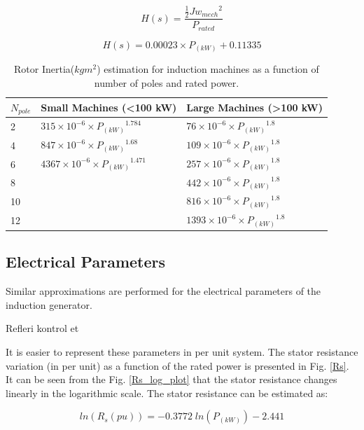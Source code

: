 \documentclass[twocolumn]{article}
\begin{document}
\begin{equation}
	H(s)=\frac{\frac{1}{2} J {w_{mech}}^2}{P_{rated}}
	\label{eq:time_constant}
\end{equation}

\begin{equation}
	H(s)=0.00023 \times P_{(kW)} + 0.11335
	\label{eq:time_constant_trend}
\end{equation}

\begin{table}
  \centering
  \begin{tabular}{lll}
   $N_{pole}$ & Small Machines (<100 kW) & Large Machines (>100 kW) \\
  \hline
2 & $315\times10^{-6}\times {P_{(kW)}}^{1.784}$ & $76\times10^{-6}\times {P_{(kW)}}^{1.8}$ \\
4 & $847\times10^{-6}\times {P_{(kW)}}^{1.68}$ & $109\times10^{-6}\times {P_{(kW)}}^{1.8}$ \\
6 & $4367\times10^{-6}\times {P_{(kW)}}^{1.471}$ & $257\times10^{-6}\times {P_{(kW)}}^{1.8}$ \\
8 &  & $442\times10^{-6}\times {P_{(kW)}}^{1.8}$ \\
10 & & $816\times10^{-6}\times {P_{(kW)}}^{1.8}$ \\
12 & & $1393\times10^{-6}\times {P_{(kW)}}^{1.8}$ \\
\hline
  \end{tabular}
  \caption{Rotor Inertia($kg m^2$) estimation for induction machines as a function of number of poles and rated power.}
  \label{inertia_estimation}
\end{table}


\subsection{Electrical Parameters} %
\label{sub:electrical_parameters}

Similar approximations are performed for the electrical parameters of the induction generator.

Refleri kontrol et \cite{Thiringer2001} 

It is easier to represent these parameters in per unit system. The stator resistance variation (in per unit) as a function of the rated power is presented in Fig. \ref{Rs}. It can be seen from the Fig. \ref{Rs_log_plot} that the stator resistance changes linearly in the logarithmic scale. The stator resistance can be estimated as:

\begin{equation}
 	ln(R_s(pu))=-0.3772\;ln (P_{(kW)}) - 2.441
 	\label{eq:Rs}
 \end{equation} 
\end{document}
